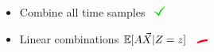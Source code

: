 \begin{frame}
\begin{columns}
\begin{column}{.6\textwidth}
\begin{itemize}
\item Combine all time samples \ \includegraphics[width=10pt]{figures/yes.png}
\item Linear combinations $\mathbb{E}[A\vec{X}\lvert Z=z]$ \ \includegraphics[width=10pt]{figures/no.png}
\end{itemize}

\end{column}
\end{columns}
\end{frame}
